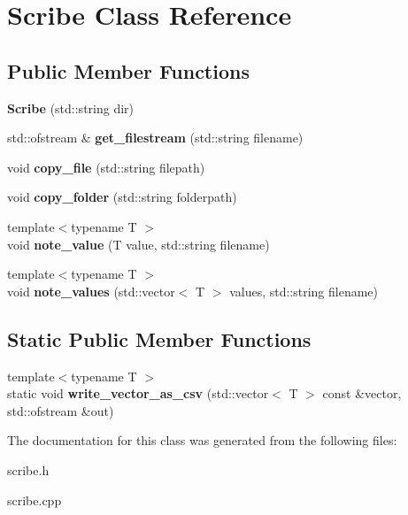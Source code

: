 \hypertarget{class_scribe}{}\section{Scribe Class Reference}
\label{class_scribe}
\subsection*{Public Member Functions}
\begin{DoxyCompactItemize}
\item 
\mbox{\label{class_scribe_a5fc74006259eba4e38e7d5469ae15941}} 
{\bfseries Scribe} (std\+::string dir)
\item 
\mbox{\label{class_scribe_ad9f897d97b0ab7c7913a47fa18353e25}} 
std\+::ofstream \& {\bfseries get\+\_\+filestream} (std\+::string filename)
\item 
\mbox{\label{class_scribe_a44f8f2c7c3b799c2efc0d26b9b7c3f1e}} 
void {\bfseries copy\+\_\+file} (std\+::string filepath)
\item 
\mbox{\label{class_scribe_a9ed32e035044cf260c57c290559c55df}} 
void {\bfseries copy\+\_\+folder} (std\+::string folderpath)
\item 
\mbox{\label{class_scribe_a7d7f1646523faf26e160fcbfb8837971}} 
{\footnotesize template$<$typename T $>$ }\\void {\bfseries note\+\_\+value} (T value, std\+::string filename)
\item 
\mbox{\label{class_scribe_a95cc9acb5e0a633506c1aa80e4aef844}} 
{\footnotesize template$<$typename T $>$ }\\void {\bfseries note\+\_\+values} (std\+::vector$<$ T $>$ values, std\+::string filename)
\end{DoxyCompactItemize}
\subsection*{Static Public Member Functions}
\begin{DoxyCompactItemize}
\item 
\mbox{\label{class_scribe_ab69d020881e9e7ab5b2bd1b724ecefc2}} 
{\footnotesize template$<$typename T $>$ }\\static void {\bfseries write\+\_\+vector\+\_\+as\+\_\+csv} (std\+::vector$<$ T $>$ const \&vector, std\+::ofstream \&out)
\end{DoxyCompactItemize}


The documentation for this class was generated from the following files\+:\begin{DoxyCompactItemize}
\item 
scribe.\+h\item 
scribe.\+cpp\end{DoxyCompactItemize}
